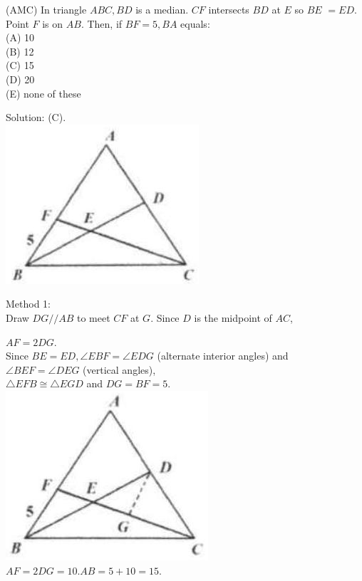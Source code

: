\documentclass{article}
\begin{document}
(AMC) In triangle \(A B C, B D\) is a median. \(C F\) intersects \(B D\) at \(E\) so \(B E\) \(=E D\). Point \(F\) is on \(A B\). Then, if \(B F=5, B A\) equals:\\
(A) 10\\
(B) 12\\
(C) 15\\
(D) 20\\
(E) none of these

Solution: (C).\\
\centering
\includegraphics[width=\textwidth]{images/102(4).jpg}

Method 1:\\
Draw \(D G / / A B\) to meet \(C F\) at \(G\). Since \(D\) is the midpoint of \(A C\),


\(A F=2 D G\).\\
Since \(B E=E D, \angle E B F=\angle E D G\) (alternate interior angles) and \(\angle B E F=\angle D E G\) (vertical angles),\\
\(\triangle E F B \cong \triangle E G D\) and \(D G=B F=5\).\\
\centering
\includegraphics[width=\textwidth]{images/103(1).jpg}\\
\(A F=2 D G=10 . A B=5+10=15\).
\end{document}
